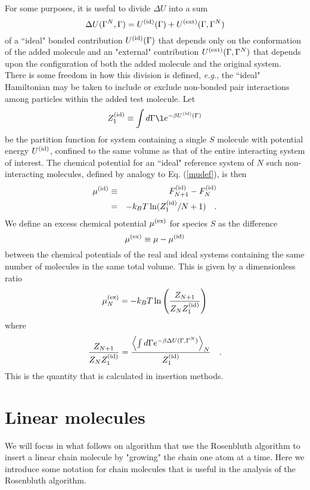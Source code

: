 \documentclass[12pt]{article} %
\newcommand{\eg}{{\it e.g.}}
\newcommand\system{\Gamma^{N}}
\newcommand\chain{\Gamma}
\newcommand\delU{\Delta U}
\newcommand\Uid{U^{({\rm id})}}
\newcommand\Uext{U^{({\rm ext})}}
\newcommand\Ztot{Z_{N+1}}
\newcommand\Zsystem{Z_{N}}
\newcommand\Zid{Z^{({\rm id})}}
\newcommand\Fid{F^{({\rm id})}}
\newcommand\muid{\mu^{({\rm id})}}
\newcommand\muex{\mu^{({\rm ex})}}
\begin{document}
For some purposes, it is useful to divide $\delU$ into a sum
\begin{equation}
   \delU(\system, \chain) = \Uid(\chain) + \Uext (\chain, \system)
\end{equation}
of a ``ideal" bonded contribution $\Uid(\chain)$ that depends only on the conformation of the added molecule and an "external" contribution $\Uext(\chain,\system)$ that depends upon the configuration of both the added molecule and the original system.  There is some freedom in how this division is defined, \eg, the ``ideal" Hamiltonian may be taken to include or exclude non-bonded pair interactions among particles within the added test molecule. Let 
\begin{equation}
    \Zid_{1} \equiv \int d\chain \l e^{-\beta \Uid(\chain) }
\end{equation}
be the partition function for system containing a single $S$ molecule with potential energy $\Uid$, confined to the same volume as that of the entire interacting system of interest. The chemical potential for an ``ideal" reference system of $N$ such non-interacting molecules, defined by analogy to Eq. (\ref{mudef}), is then
\begin{eqnarray}
    \muid & \equiv & \Fid_{N+1} - \Fid_{N}  \nonumber \\
          & =      & -k_{B}T\ln(\Zid_{1}/N+1)
    \quad.
\end{eqnarray}
We define an excess chemical potential $\muex$ for species $S$ as the difference
\begin{equation}
     \muex \equiv \mu - \muid
\end{equation}
between the chemical potentials of the real and ideal systems containing the same number of molecules in the same total volume. This is given by a dimensionless ratio
\begin{equation}
   \muex_{N}  = -k_{B}T \ln \left ( \frac{\Ztot}{\Zsystem \Zid_{1}} \right )
\end{equation}
where
\begin{equation}
  \frac{\Ztot}{\Zsystem \Zid_{1}} = 
  \frac{\left \langle \int d\chain e^{-\beta \delU(\chain, \system)} \right \rangle_{N}} 
       {\Zid_{1}} 
  \quad.
\end{equation}
This is the quantity that is calculated in insertion methods.

\section{Linear molecules}
We will focus in what follows on algorithm that use the Rosenbluth algorithm to insert a linear chain molecule by "growing" the chain one atom at a time. Here we introduce some notation for chain molecules that is useful in the analysis of the Rosenbluth algorithm.
\end{document}
